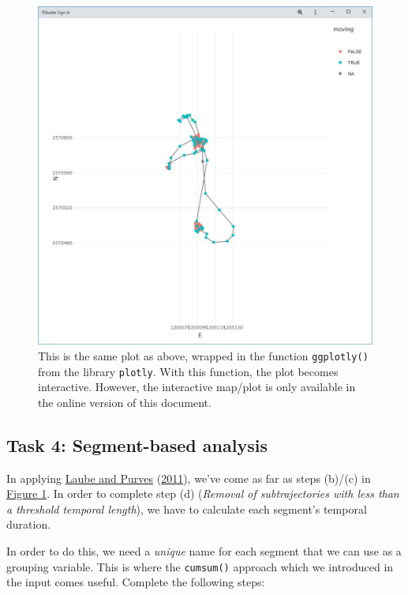 \documentclass[
]{book}
\begin{document}
\begin{figure}
\centering
\includegraphics{02_Images/w03_ex3_p1.jpg}
\caption{This is the same plot as above, wrapped in the function \texttt{ggplotly()} from the library \texttt{plotly}. With this function, the plot becomes interactive. However, the interactive map/plot is only available in the online version of this document.}
\end{figure}

\hypertarget{task-4-segment-based-analysis}{%
\subsection{Task 4: Segment-based analysis}\label{task-4-segment-based-analysis}}

In applying \protect\hyperlink{ref-laube2011}{Laube and Purves} (\protect\hyperlink{ref-laube2011}{2011}), we've come as far as steps (b)/(c) in \href{02_Images/laube_2011.jpg}{Figure 1}. In order to complete step (d) (\emph{Removal of subtrajectories with less than a threshold temporal length}), we have to calculate each segment's temporal duration.

In order to do this, we need a \emph{unique} name for each segment that we can use as a grouping variable. This is where the \texttt{cumsum()} approach which we introduced in the input comes useful. Complete the following steps:
\end{document}
